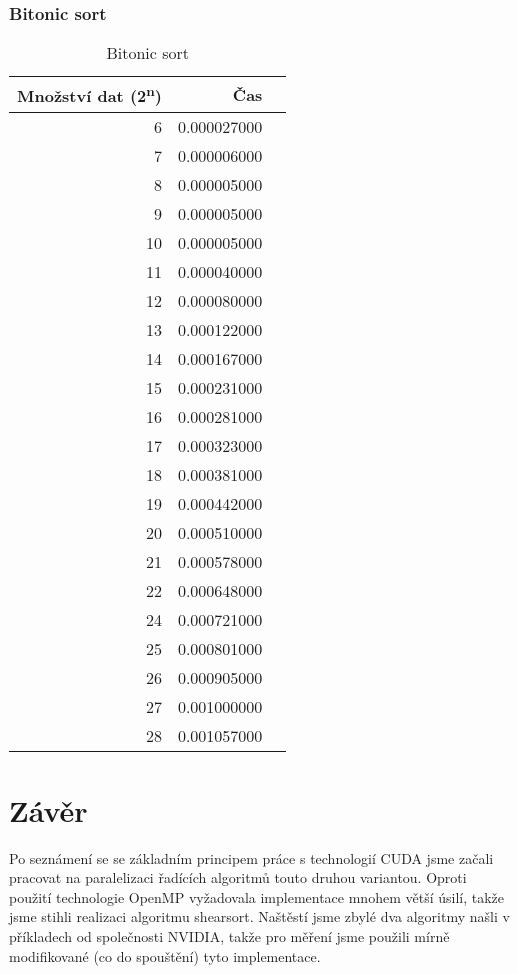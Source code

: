 \documentclass[12pt]{article}
\begin{document}
\subsubsection{Bitonic sort}
\begin{table}[H]
\begin{center}
\begin{tabular}{|r|r|r|}
\hline Množství dat (2\textsuperscript{n}) & Čas \\ \hline
6  &   0.000027000  \\ \hline
7  &   0.000006000  \\ \hline
8  &   0.000005000  \\ \hline
9  &   0.000005000  \\ \hline
10 &   0.000005000  \\ \hline
11 &   0.000040000  \\ \hline
12 &   0.000080000  \\ \hline
13 &   0.000122000  \\ \hline
14 &   0.000167000  \\ \hline
15 &   0.000231000  \\ \hline
16 &   0.000281000  \\ \hline
17 &   0.000323000  \\ \hline
18 &   0.000381000  \\ \hline
19 &   0.000442000  \\ \hline
20 &   0.000510000  \\ \hline
21 &   0.000578000  \\ \hline
22 &   0.000648000  \\ \hline
24 &   0.000721000  \\ \hline
25 &   0.000801000  \\ \hline
26 &   0.000905000  \\ \hline
27 &   0.001000000  \\ \hline
28 &   0.001057000  \\ \hline
\end{tabular} 
\end{center}
\caption{Bitonic sort}
\end{table} 


\section{Závěr}
Po seznámení se se základním principem práce s technologií CUDA jsme začali pracovat na paralelizaci řadících algoritmů touto druhou variantou. Oproti použití technologie OpenMP vyžadovala implementace mnohem větší úsilí, takže jsme stihli realizaci algoritmu shearsort. Naštěstí jsme zbylé dva algoritmy našli v příkladech od společnosti NVIDIA, takže pro měření jsme použili mírně modifikované (co do spouštění) tyto implementace.
\end{document}
